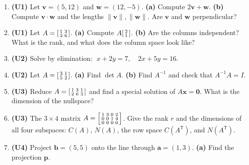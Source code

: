 \documentclass[10pt]{article}
\newcommand{\vv}{\mathbf{v}}
\newcommand{\ww}{\mathbf{w}}
\newcommand{\xx}{\mathbf{x}}
\newcommand{\bb}{\mathbf{b}}
\newcommand{\pp}{\mathbf{p}}
\newcommand{\zero}{\mathbf{0}}
\newcommand{\avec}{\mathbf{a}}
\newcommand{\T}{\mathsf{T}}
\begin{document}
\begin{enumerate}[leftmargin=1.9em, itemsep=10pt]
  \item \textbf{(U1)} Let $\vv=(5,12)$ and $\ww=(12,-5)$.
        \textbf{(a)} Compute $2\vv+\ww$. \textbf{(b)} Compute $\vv\cdot\ww$ and the lengths $\|\vv\|,\|\ww\|$.
        Are $\vv$ and $\ww$ perpendicular?
        \vspace{2.2cm}
  \item \textbf{(U1)} Let $A=\begin{bsmallmatrix}1&3\\2&6\end{bsmallmatrix}$.
        \textbf{(a)} Compute $A\begin{bsmallmatrix}2\\1\end{bsmallmatrix}$.
        \textbf{(b)} Are the columns independent? What is the rank, and what does the column space look like?
        \vspace{2.2cm}
  \item \textbf{(U2)} Solve by elimination: $\;x+2y=7,\quad 2x+5y=16.$
        \vspace{2.2cm}
  \item \textbf{(U2)} Let $A=\begin{bsmallmatrix}3&1\\5&2\end{bsmallmatrix}$.
        \textbf{(a)} Find $\det A$. \textbf{(b)} Find $A^{-1}$ and check that $A^{-1}A=I$.
        \vspace{2.4cm}
  \item \textbf{(U3)} Reduce $A=\begin{bsmallmatrix}1&3&1\\2&6&3\end{bsmallmatrix}$ and find a special solution of $A\xx=\zero$.
        What is the dimension of the nullspace?
        \vspace{2.4cm}
  \item \textbf{(U3)} The $3\times4$ matrix $A=\begin{bsmallmatrix}1&3&0&2\\0&0&1&4\\0&0&0&0\end{bsmallmatrix}$.
        Give the rank $r$ and the dimensions of all four subspaces: $C(A)$, $N(A)$, the row space $C(A^\T)$, and $N(A^\T)$.
        \vspace{2.6cm}
  \item \textbf{(U4)} Project $\bb=(5,5)$ onto the line through $\avec=(1,3)$. \textbf{(a)} Find the projection $\pp$.

\end{enumerate}
\end{document}
